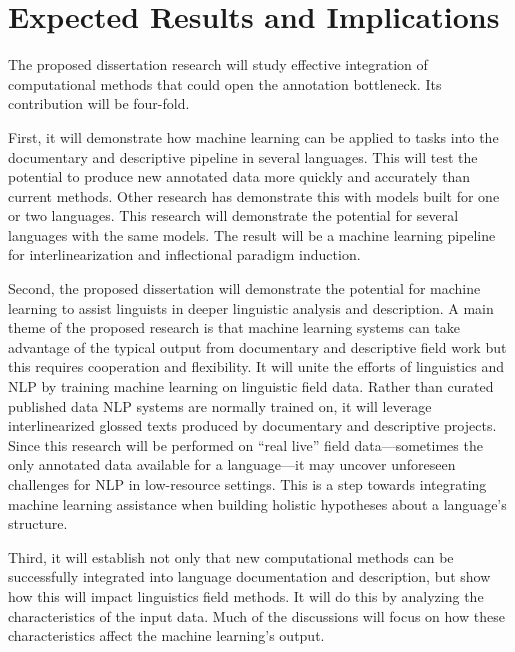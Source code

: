 \section{Expected Results and Implications}

The proposed dissertation research will study effective integration of computational methods that could open the annotation bottleneck. 
Its contribution will be four-fold. 

First, it will demonstrate how machine learning can be applied to tasks into the documentary and descriptive pipeline in several languages. This will test the potential to produce new annotated data more quickly and accurately than current methods. Other research has demonstrate this with models built for one or two languages. This research will demonstrate the potential for several languages with the same models. The result will be a machine learning pipeline for interlinearization and inflectional paradigm induction.

Second, the proposed dissertation will demonstrate the potential for machine learning to assist linguists in deeper linguistic analysis and description. A main theme of the proposed research is that machine learning systems can take advantage of the typical output from documentary and descriptive field work but this requires cooperation and flexibility. It will unite the efforts of linguistics and NLP by training machine learning on linguistic field data. Rather than curated published data  NLP systems are normally trained on, it will leverage interlinearized glossed texts produced by documentary and descriptive projects. Since this research will be performed on “real live” field data---sometimes the only annotated data available for a language---it may uncover unforeseen challenges for NLP in low-resource settings.
This is a step towards integrating machine learning assistance when building holistic hypotheses about a language's structure.

Third, it will establish not only that new computational methods can be successfully integrated into language documentation and description, but show how this will impact linguistics field methods. It will do this by analyzing the characteristics of the input data. Much of the discussions will focus on how these characteristics affect the machine learning's output.

